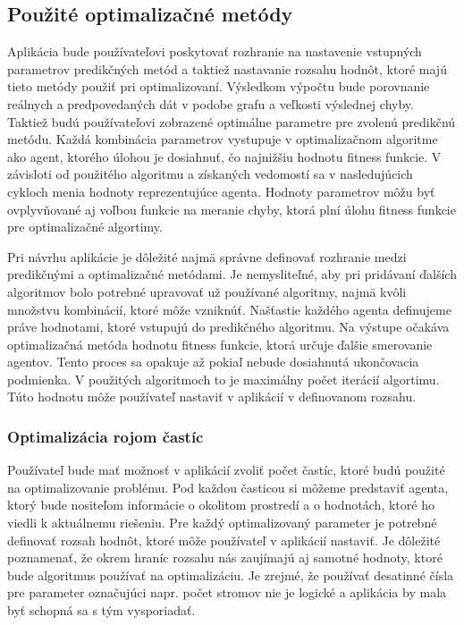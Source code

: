 \documentclass[a4paper,slovak,12pt,appendix]{article}
\begin{document}

\subsection{Použité optimalizačné metódy}
Aplikácia bude používateľovi poskytovať rozhranie na nastavenie vstupných
parametrov predikčných metód a taktiež nastavanie rozsahu hodnôt, ktoré majú
tieto metódy použiť pri optimalizovaní. Výsledkom výpočtu bude porovnanie
reálnych a predpovedaných dát v podobe grafu a veľkosti výslednej chyby.
Taktiež budú používateľovi zobrazené optimálne parametre pre zvolenú predikčnú
metódu. Každá kombinácia parametrov vystupuje v optimalizačnom algoritme ako
agent, ktorého úlohou je dosiahnuť, čo najnižšiu hodnotu fitness funkcie.
V závisloti od použitého algoritmu a získaných vedomostí sa v nasledujúcich
cykloch menia hodnoty reprezentujúce agenta. Hodnoty parametrov môžu byť
ovplyvňované aj voľbou funkcie na meranie chyby, ktorá plní úlohu fitness
funkcie pre optimalizačné algortimy.

Pri návrhu aplikácie je dôležité najmä správne definovať rozhranie medzi
predikčnými a optimalizačné metódami. Je nemysliteľné, aby pri pridávaní
ďalších algoritmov bolo potrebné upravovať už používané algoritmy, najmä kvôli
množstvu kombinácií, ktoré môže vzniknúť. Našťastie každého agenta definujeme
práve hodnotami, ktoré vstupujú do predikčného algoritmu. Na výstupe očakáva
optimalizačná metóda hodnotu fitness funkcie, ktorá určuje ďalšie smerovanie
agentov. Tento proces sa opakuje až pokiaľ nebude dosiahnutá ukončovacia
podmienka. V použitých algoritmoch to je maximálny počet iterácií algortimu.
Túto hodnotu môže používateľ nastaviť v aplikácií v definovanom rozsahu.

\subsubsection{Optimalizácia rojom častíc}
Používateľ bude mať možnosť v aplikácií zvoliť počet častíc, ktoré budú
použité na optimalizovanie problému. Pod každou časticou si môžeme predstaviť
agenta, ktorý bude nositeľom informácie o okolitom prostredí a o hodnotách,
ktoré ho viedli k aktuálnemu riešeniu. Pre každý optimalizovaný parameter je
potrebné definovať rozsah hodnôt, ktoré môže používateľ v aplikácií nastaviť.
Je dôležité poznamenať, že okrem hraníc rozsahu nás zaujímajú aj samotné
hodnoty, ktoré bude algoritmus používať na optimalizáciu. Je zrejmé, že
používať desatinné čísla pre parameter označujúci napr. počet stromov nie je
logické a aplikácia by mala byť schopná sa s tým vysporiadať.
\end{document}
